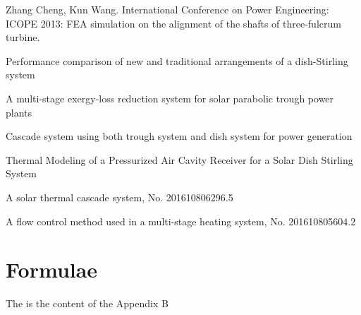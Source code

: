 \appendix

\begin{publications}

  \item Zhang Cheng, Kun Wang. International Conference on Power Engineering: ICOPE 2013: FEA simulation on the alignment of the shafts of three-fulcrum turbine.
  \item Performance comparison of new and traditional arrangements of a dish-Stirling system
	\item A multi-stage exergy-loss reduction system for solar parabolic trough power plants
	\item Cascade system using both trough system and dish system for power generation
  \item Thermal Modeling of a Pressurized Air Cavity Receiver for a Solar Dish Stirling System

  \item A solar thermal cascade system, No. 201610806296.5
  \item A flow control method used in a multi-stage heating system, No. 201610805604.2

\end{publications}

\chapter{Formulae}\label{appendix:2}
  The is the content of the Appendix B
